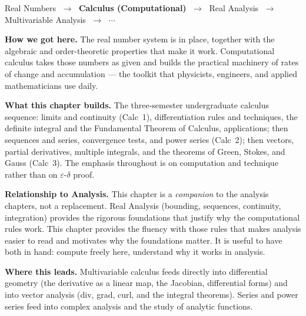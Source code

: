
\begin{tcolorbox}[
  colback=gray!6,
  colframe=gray!40,
  arc=2pt,
  left=8pt, right=8pt, top=6pt, bottom=6pt,
  title={\small\textbf{Where You Are in the Journey}},
  fonttitle=\small\bfseries
]
\begin{center}
\small
Real Numbers
$\;\to\;$ \textbf{Calculus (Computational)}
$\;\to\;$ Real Analysis
$\;\to\;$ Multivariable Analysis
$\;\to\;$ $\cdots$
\end{center}

\medskip
\noindent\textbf{How we got here.}
The real number system is in place, together with the algebraic
and order-theoretic properties that make it work.
Computational calculus takes those numbers as given and builds
the practical machinery of rates of change and accumulation ---
the toolkit that physicists, engineers, and applied
mathematicians use daily.

\medskip
\noindent\textbf{What this chapter builds.}
The three-semester undergraduate calculus sequence: limits and
continuity (Calc~1), differentiation rules and techniques,
the definite integral and the Fundamental Theorem of Calculus,
applications; then sequences and series, convergence tests,
and power series (Calc~2); then vectors, partial derivatives,
multiple integrals, and the theorems of Green, Stokes, and
Gauss (Calc~3).
The emphasis throughout is on computation and technique rather
than on $\varepsilon$-$\delta$ proof.

\medskip
\noindent\textbf{Relationship to Analysis.}
This chapter is a \emph{companion} to the analysis chapters,
not a replacement.
Real Analysis (bounding, sequences, continuity, integration)
provides the rigorous foundations that justify why the
computational rules work.
This chapter provides the fluency with those rules that makes
analysis easier to read and motivates why the foundations
matter.
It is useful to have both in hand: compute freely here,
understand why it works in analysis.

\medskip
\noindent\textbf{Where this leads.}
Multivariable calculus feeds directly into differential geometry
(the derivative as a linear map, the Jacobian, differential
forms) and into vector analysis (div, grad, curl, and the
integral theorems).
Series and power series feed into complex analysis and the
study of analytic functions.
\end{tcolorbox}
\vspace{1em}

